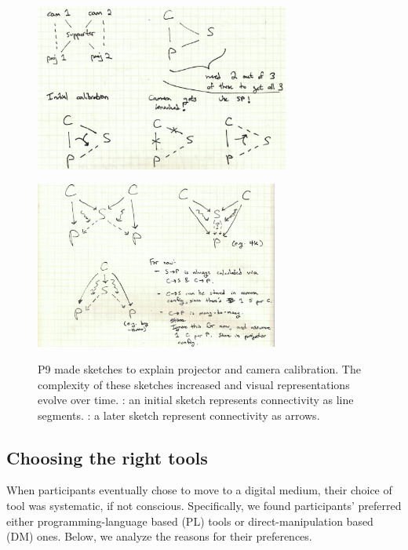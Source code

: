 \begin{figure}
     \centering
     \begin{minipage}[c]{0.49\textwidth}
         \centering
         \includegraphics[height=5.5cm]{assets/interviews/sketch-1.png}
         \label{fig:sketch-1}
     \end{minipage}
     \hfill
     \begin{minipage}[c]{0.49\textwidth}
         \centering
         \includegraphics[height=5.5cm]{assets/interviews/sketch-2.png}
         \label{fig:sketch-2}
     \end{minipage}
     \caption{P9 made sketches to explain projector and camera calibration. The complexity of these sketches increased and visual representations evolve over time. : an initial sketch represents connectivity as line segments. : a later sketch represent connectivity as arrows. }
     \label{fig:sketch}
\end{figure}

\subsection{Choosing the right tools} 

When participants eventually chose to move to a digital medium, their choice of tool was systematic, if not conscious. Specifically, we found participants' preferred either  programming-language based (PL) tools or  direct-manipulation based (DM) ones. Below, we analyze the reasons for their preferences. 
    
